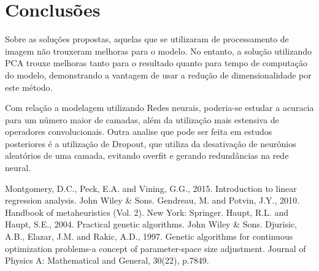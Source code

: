 \documentclass[conference]{IEEEtran}
\begin{document}
\section{Conclusões}
Sobre as soluções propostas, aquelas que se utilizaram de processamento de imagem não trouxeram melhoras para o modelo. No entanto, a solução utilizando PCA trouxe melhoras tanto para o resultado quanto para tempo de computação do modelo, demonstrando a vantagem de usar a redução de dimensionalidade por este método.

Com relação a modelagem utilizando Redes neurais, poderia-se estudar a acuracia para um número maior de camadas, além da utilização mais estensiva de operadores convolucionais. Outra analise que pode ser feita em estudos posteriores é a utilização de Dropout, que utiliza da desativação de neurônios aleatórios de uma camada, evitando overfit e gerando redundâncias na rede neural. 

\begin{thebibliography}{00}
 Montgomery, D.C., Peck, E.A. and Vining, G.G., 2015. Introduction to linear regression analysis. John Wiley \& Sons.
 Gendreau, M. and Potvin, J.Y., 2010. Handbook of metaheuristics (Vol. 2). New York: Springer.
 Haupt, R.L. and Haupt, S.E., 2004. Practical genetic algorithms. John Wiley \& Sons.
 Djurisic, A.B., Elazar, J.M. and Rakic, A.D., 1997. Genetic algorithms for continuous optimization problems-a concept of parameter-space size adjustment. Journal of Physics A: Mathematical and General, 30(22), p.7849.
\end{thebibliography}
\end{document}
